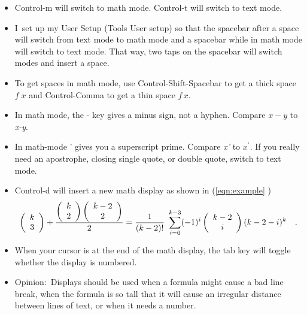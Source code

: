 \begin{itemize}
\item Control-m will switch to math mode. Control-t will switch to text mode.

\item I\ set up my User Setup (Tools \TEXTsymbol{>}\TEXTsymbol{>} User
setup) so that the spacebar after a space will switch from text mode to math
mode and a spacebar while in math mode will switch to text mode. That way,
two taps on the spacebar will switch modes and insert a space.

\item To get spaces in math mode, use Control-Shift-Spacebar to get a thick
space $f\;x$ and Control-Comma to get a thin space $f\,x$.

\item In math mode, the - key gives a minus sign, not a hyphen. Compare $x-y$
to \textit{x-y}.

\item In math-mode ' gives you a superscript prime. Compare \textit{x'} to $%
x^{\prime }$. If you really need an apostrophe, closing single quote, or
double quote, switch to text mode.

\item Control-d will insert a new math display as shown in (\ref{eqn:example}%
) 
\begin{equation}
\left( 
\begin{array}{c}
k \\ 
3%
\end{array}%
\right) +\frac{\left( 
\begin{array}{c}
k \\ 
2%
\end{array}%
\right) \left( 
\begin{array}{c}
k-2 \\ 
2%
\end{array}%
\right) }{2}=\frac{1}{(k-2)!}\ \sum_{i=0}^{k-3}(-1)^{i}\left( 
\begin{array}{c}
k-2 \\ 
i%
\end{array}%
\right) (k-2-i)^{k}\text{\quad .}  \label{eqn:example}
\end{equation}

\item When your cursor is at the end of the math display, the tab key will
toggle whether the display is numbered.

\item Opinion:\ Displays should be used when a formula might cause a bad
line break, when the formula is so tall that it will cause an irregular
distance between lines of text, or when it needs a number.


\end{itemize}
